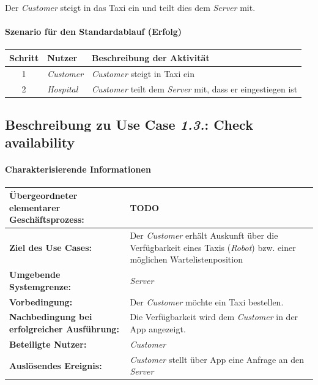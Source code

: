 				Der \emph{Customer} steigt in das Taxi ein und teilt dies dem \emph{Server} mit.
					\paragraph*{Szenario für den Standardablauf (Erfolg)}
	
				\begin{table}[H]
					\centering
					\begin{tabularx}{\textwidth}{|c|p{2cm}|X|}
					\hline
					Schritt & Nutzer & Beschreibung der Aktivität \\ \hline
					1 & \emph{Customer} & \emph{Customer} steigt in Taxi ein \\
					2 & \emph{Hospital} & \emph{Customer} teilt dem \emph{Server} mit, dass er eingestiegen ist \\
					\hline
					\end{tabularx}
				\end{table}
				
				
			\subsection{Beschreibung zu Use Case \emph{1.3.}: Check availability}
				\paragraph*{Charakterisierende Informationen}
				
				\begin{table}[H]
					\centering
					\begin{tabularx}{\textwidth}{|p{5cm}|X|}
						\hline
						\textbf{Übergeordneter elementarer Geschäftsprozess:} & TODO  \\ \hline
						\textbf{Ziel des Use Cases:} & Der \emph{Customer} erhält Auskunft über die Verfügbarkeit eines Taxis (\emph{Robot}) bzw. einer möglichen Wartelistenposition \\ \hline
						\textbf{Umgebende Systemgrenze:} & \emph{Server} \\ \hline
						\textbf{Vorbedingung:} & Der \emph{Customer} möchte ein Taxi bestellen. \\ \hline
						\textbf{Nachbedingung bei erfolgreicher Ausführung:} & Die Verfügbarkeit wird dem \emph{Customer} in der App angezeigt. \\ \hline
						\textbf{Beteiligte Nutzer:} & \emph{Customer} \\ \hline
						\textbf{Auslösendes Ereignis:} & \emph{Customer} stellt über App eine Anfrage an den \emph{Server} \\
						\hline
					\end{tabularx}
				\end{table}
				
